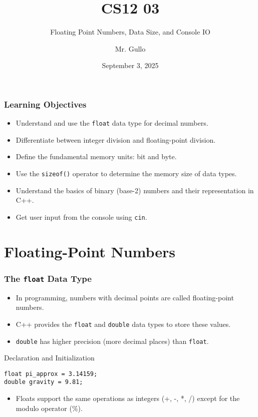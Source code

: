 \documentclass{beamer}
\title[Floats, Memory and IO]{CS12 03}
\subtitle{Floating Point Numbers, Data Size, and Console IO}
\author[Mr. Gullo]{Mr. Gullo}
\date[Sep 3, 2025]{September 3, 2025}
\begin{document}
\frame{\titlepage}

\begin{frame}
\frametitle{Learning Objectives}
\begin{itemize}
    \item Understand and use the \texttt{float} data type for decimal numbers.
    \item Differentiate between integer division and floating-point division.
    \item Define the fundamental memory units: \alert{bit} and \alert{byte}.
    \item Use the \texttt{sizeof()} operator to determine the memory size of data types.
    \item Understand the basics of binary (base-2) numbers and their representation in C++.
    \item Get user input from the console using \texttt{cin}.
\end{itemize}
\end{frame}

\section{Floating-Point Numbers}

\begin{frame}[fragile]
\frametitle{The \texttt{float} Data Type}
\begin{itemize}
    \item In programming, numbers with decimal points are called \alert{floating-point numbers}.
    \item C++ provides the \texttt{float} and \texttt{double} data types to store these values.
    \item \texttt{double} has higher precision (more decimal places) than \texttt{float}.
\end{itemize}

\begin{block}{Declaration and Initialization}
\begin{verbatim}
float pi_approx = 3.14159;
double gravity = 9.81;
\end{verbatim}
\end{block}

\begin{itemize}
    \item Floats support the same operations as integers (+, -, *, /) except for the modulo operator (\%).
\end{itemize}
\end{frame}
\end{document}
